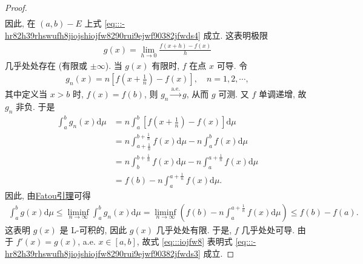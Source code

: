 \documentclass[../../main.tex]{subfiles}%
\begin{document}
\begin{proof}
\begin{align*}
\end{align*}
因此, 在 $(a,b)-E$ 上式 \eqref{eq:::-hr82h39rhswufh8jiojshiojfw8290rui9ejwf90382jfwds4} 成立. 这表明极限
\begin{align*}
g(x) = \lim_{h\to 0} \frac{f(x+h)-f(x)}{h}
\end{align*}
几乎处处存在 (有限或 $\pm\infty$). 当 $g(x)$ 有限时, $f$ 在点 $x$ 可导. 令
\begin{align*}
g_n(x) = n\left[f\!\left(x+\frac{1}{n}\right)-f(x)\right],\quad n=1,2,\cdots,
\end{align*}
其中定义当 $x>b$ 时, $f(x)=f(b)$, 则 $g_n\xrightarrow{\text{a.e.}} g$, 从而 $g$ 可测. 又 $f$ 单调递增, 故 $g_n$ 非负. 于是
\begin{align*}
\int_a^b g_n(x)\mathrm{d}\mu &= n\int_a^b \left[f\!\left(x+\frac{1}{n}\right)-f(x)\right]\mathrm{d}\mu \\
&= n\int_{a+\frac{1}{n}}^{b+\frac{1}{n}} f(x)\mathrm{d}\mu - n\int_a^b f(x)\mathrm{d}\mu \\
&= n\int_b^{b+\frac{1}{n}} f(x)\mathrm{d}\mu - n\int_a^{a+\frac{1}{n}} f(x)\mathrm{d}\mu \\
&= f(b)-n\int_a^{a+\frac{1}{n}} f(x)\mathrm{d}\mu.
\end{align*}
因此, 由\hyperref[theorem:Fatou引理]{Fatou引理}可得
\begin{align}
\int_a^b g(x)\mathrm{d}\mu \leqslant \liminf_{n\to\infty} \int_a^b g_n(x)\mathrm{d}\mu  = \liminf_{n\to\infty} \left(f(b)-n\int_a^{a+\frac{1}{n}} f(x)\mathrm{d}\mu\right) \leqslant f(b)-f(a). \label{eq:::iojfw8}
\end{align}
这表明 $g(x)$ 是 L-可积的, 因此 $g(x)$ 几乎处处有限. 于是, $f$ 几乎处处可导. 由于 $f'(x)=g(x)$, a.e. $x\in[a,b]$, 故式 \eqref{eq:::iojfw8} 表明式 \eqref{eq:::-hr82h39rhswufh8jiojshiojfw8290rui9ejwf90382jfwds3} 成立.
\end{proof}
\end{document}
